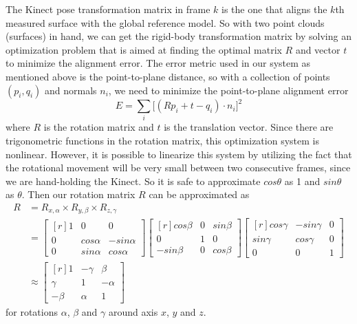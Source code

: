 \documentclass[12pt]{article}
\begin{document}
The Kinect pose transformation matrix in frame $k$ is the one that aligns the $k$th measured surface with the global reference model. So with two point clouds (surfaces) in hand, we can get the rigid-body transformation matrix by solving an optimization problem that is aimed at finding the optimal matrix $R$ and vector $t$ to minimize the alignment error. The error metric used in our system as mentioned above is the point-to-plane distance, so with a collection of points $(p_i,q_i)$ and normals $n_i$, we need to minimize the point-to-plane alignment error
$$
E = \sum_{i}{}\big[(Rp_i+t-q_i)\cdot n_i\big]^2
$$
where $R$ is the rotation matrix and $t$ is the translation vector. Since there are trigonometric functions in the rotation matrix, this optimization system is nonlinear. However, it is possible to linearize this system by utilizing the fact that the rotational movement will be very small between two consecutive frames, since we are hand-holding the Kinect. So it is safe to approximate $cos\theta$ as 1 and $sin\theta$ as $\theta$. Then our rotation matrix $R$ can be approximated as
\begin{equation}\label{rotation_matrix}
    \begin{split}
        R &= R_{x,\alpha}\times R_{y,\beta}\times R_{z,\gamma}\\
          &=
        \begin{bmatrix*}[r]
            1   &   0           &   0           \\
            0   &   cos\alpha   &   -sin\alpha  \\
            0   &   sin\alpha   &   cos\alpha
        \end{bmatrix*}
        \begin{bmatrix*}[r]
            cos\beta    &   0   &   sin\beta    \\
            0           &   1   &   0           \\
            -sin\beta   &   0   &   cos\beta
        \end{bmatrix*}
        \begin{bmatrix*}[r]
            cos\gamma   &   -sin\gamma   &   0  \\
            sin\gamma   &   cos\gamma    &   0  \\
            0           &   0            &   1
        \end{bmatrix*}\\
        &\approx
        \begin{bmatrix*}[r]
            1       &  -\gamma  &   \beta   \\
            \gamma  &  1        &   -\alpha \\
            -\beta  &  \alpha   &   1
        \end{bmatrix*}
    \end{split}
\end{equation}
for rotations $\alpha$, $\beta$ and $\gamma$ around axis $x$, $y$ and $z$.
\end{document}
